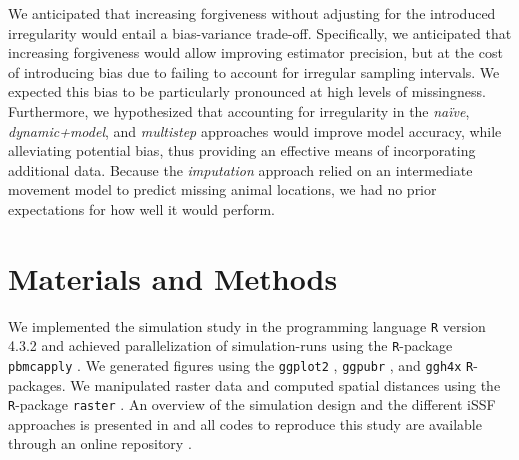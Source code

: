 \documentclass[../FinalThesis.tex]{subfiles}
\begin{document}
We anticipated that increasing forgiveness without adjusting for the introduced
irregularity would entail a bias-variance trade-off. Specifically, we
anticipated that increasing forgiveness would allow improving estimator
precision, but at the cost of introducing bias due to failing to account for
irregular sampling intervals. We expected this bias to be particularly
pronounced at high levels of missingness. Furthermore, we hypothesized that
accounting for irregularity in the \textit{na\"ive}, \textit{dynamic+model}, and
\textit{multistep} approaches would improve model accuracy, while alleviating
potential bias, thus providing an effective means of incorporating additional
data. Because the \textit{imputation} approach relied on an intermediate
movement model to predict missing animal locations, we had no prior expectations
for how well it would perform.

\section{Materials and Methods}

We implemented the simulation study in the programming language \texttt{R}
version 4.3.2 \citep{RCoreTeam.2023} and achieved parallelization of
simulation-runs using the \texttt{R}-package \texttt{pbmcapply}
\citep{Kuang.2024}. We generated figures using the \texttt{ggplot2}
\citep{Wickham.2024}, \texttt{ggpubr} \citep{Kassambara.2024}, and
\texttt{ggh4x} \citep{Brand.2024} \texttt{R}-packages. We manipulated raster
data and computed spatial distances using the \texttt{R}-package \texttt{raster}
\citep{Hijmans.2024}. An overview of the simulation design and the different
iSSF approaches is presented in  and all codes to reproduce this
study are available through an online repository \citep{Hofmann.2023a}.
\end{document}
